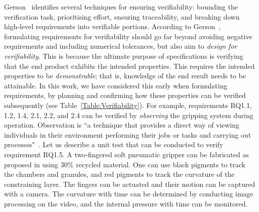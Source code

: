 \documentclass[letterpaper, 10 pt, conference]{ieeeconf}  %
\begin{document}
	Gerson~\cite{Gerson1993} identifies several techniques for ensuring verifiability: bounding the verification task, prioritising effort, ensuring traceability, and breaking down high-level requirements into verifiable portions. 
	According to Gerson~\cite{Gerson1993}, formulating requirements for verifiability should go far beyond avoiding negative requirements and including numerical tolerances, but also aim to \emph{design for verifiability}. 
	This is because the ultimate purpose of specifications is verifying that the end product exhibits the intended properties. 
	This requires the intended properties to be \emph{demonstrable}; that is, knowledge of the end result needs to be attainable. 
	In this work, we have considered this early when formulating requirements, by planning and confirming how these properties can be verified subsequently (see Table~\ref{Table:Verifiability}). 
	For example, requirements RQ1.1, 1.2, 1.4, 2.1, 2.2, and 2.4 can be verified by \emph{observing} the gripping system during operation. 
	Observation is ``a technique that provides a direct way of viewing individuals in their environment performing their jobs or tasks and carrying out processes"~\cite{ISO24765:2017}.
	Let us describe a unit test that can be conducted to verify requirement RQ1.5. 
	A two-fingered soft pneumatic gripper can be fabricated as proposed in \cite{Partridge2022} using 30\% recycled material. 
	One can use black pigments to track the chambers and granules, and red pigments to track the curvature of the constraining layer. 
	The fingers can be actuated and their motion can be captured with a camera. 
	The curvature with time can be determined by conducting image processing on the video, and the internal pressure with time can be monitored.
	
\end{document}

